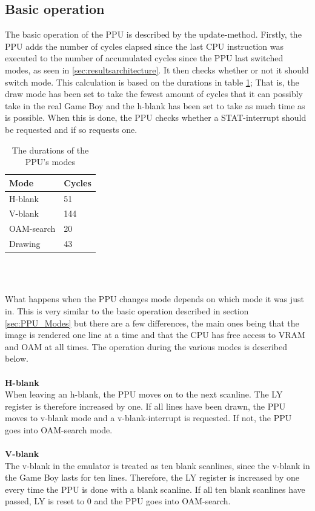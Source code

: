 \subsection{Basic operation}
The basic operation of the PPU is described by the update-method. Firstly, the PPU adds the number of cycles elapsed since the last CPU instruction was executed to the number of accumulated cycles since the PPU last switched modes, as seen in \ref{sec:resultsarchitecture}. It then checks whether or not it should switch mode. This calculation is based on the durations in table \ref{tab:PPU_mode_durations}; That is, the draw mode has been set to take the fewest amount of cycles that it can possibly take in the real Game Boy and the h-blank has been set to take as much time as is possible. When this is done, the PPU checks whether a STAT-interrupt should be requested and if so requests one.
\begin{table}[H]
    \centering
\begin{tabular}{l|l}
    \textbf{Mode} & \textbf{Cycles} \\
    \hline
    H-blank & 51\\
    V-blank & 144\\
    OAM-search & 20\\
    Drawing & 43
\end{tabular}
\\\
    \caption{The durations of the PPU's modes}
    \label{tab:PPU_mode_durations}
\end{table}
What happens when the PPU changes mode depends on which mode it was just in. This is very similar to the basic operation described in section \ref{sec:PPU_Modes} but there are a few differences, the main ones being that the image is rendered one line at a time and that the CPU has free access to VRAM and OAM at all times. The operation during the various modes is described below.\\
\\
\textbf{H-blank}\\
When leaving an h-blank, the PPU moves on to the next scanline. The LY register is therefore increased by one. If all lines have been drawn, the PPU moves to v-blank mode and a v-blank-interrupt is requested. If not, the PPU goes into OAM-search mode.\\
\\
\textbf{V-blank}\\
The v-blank in the emulator is treated as ten blank scanlines, since the v-blank in the Game Boy lasts for ten lines. Therefore, the LY register is increased by one every time the PPU is done with a blank scanline. If all ten blank scanlines have passed, LY is reset to 0 and the PPU goes into OAM-search.\\
